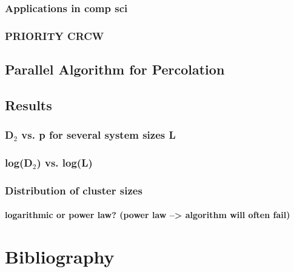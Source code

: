 \documentclass[pre,preprint]{revtex4-1}
\begin{document}
\subsubsection{Applications in comp sci}
\label{sec-4.3.1}
\subsubsection{PRIORITY CRCW}
\label{sec-4.3.2}
\subsection{Parallel Algorithm for Percolation}
\label{sec-4.4}
\subsection{Results}
\label{sec-4.5}
\subsubsection{D$_2$ vs. p for several system sizes L}
\label{sec-4.5.1}
\subsubsection{log(D$_2$) vs. log(L)}
\label{sec-4.5.2}
\subsubsection{Distribution of cluster sizes}
\label{sec-4.5.3}
\paragraph{logarithmic or power law? (power law --> algorithm will often fail)}
\label{sec-4.5.3.1}
\section{Bibliography}
\label{sec-5}




 
\end{document}
